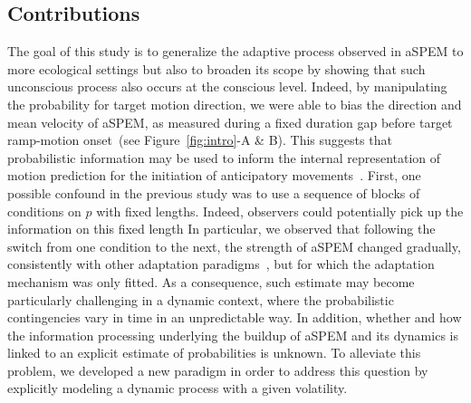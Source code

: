 \documentclass[profile,final,english, draft]{article}%
\newcommand{\citep}[1]{\parencite{#1}}
\newcommand{\seeFig}[1]{see Figure~\ref{fig:#1}}
\begin{document}
\subsection{Contributions}%
The goal of this study is to generalize the adaptive process
observed in aSPEM to more ecological settings but
also to broaden its scope by showing that such unconscious process
also occurs at the conscious level.
Indeed, by manipulating the probability for target motion direction,
we were able to bias the direction and mean velocity of aSPEM,
as measured during a fixed duration gap
before target ramp-motion onset~(\seeFig{intro}-A \& B).
This suggests that probabilistic information may be used
to inform the internal representation of motion prediction
for the initiation of anticipatory movements~\citep{Montagnini2010}.
First, one possible confound in the previous study was
to use a sequence of blocks of conditions on $p$ with fixed lengths.
Indeed, observers could potentially pick up
the information on this fixed length
In particular, we observed that following the switch from
one condition to the next,
the strength of aSPEM changed gradually,
consistently with other adaptation paradigms~\citep{SoutoXXSacadicAdaptation},
but for which the adaptation mechanism was only fitted.
As a consequence, such estimate may become particularly
challenging in a dynamic context,
where the probabilistic contingencies vary in time in an unpredictable way.
In addition, whether and how the information processing underlying
the buildup of aSPEM and its dynamics is linked to
an explicit estimate of probabilities is unknown.
To alleviate this problem, we developed a new paradigm
in order to address this question
by explicitly modeling a dynamic process with a given volatility.
\end{document}
